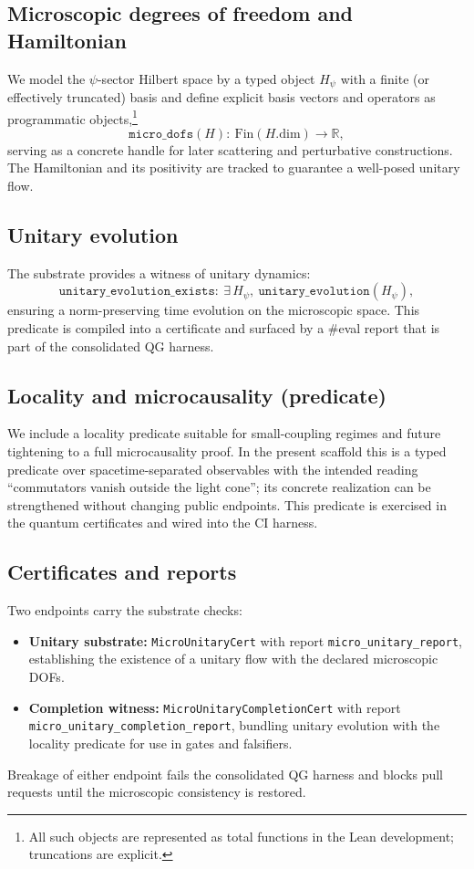 \documentclass[aps,prd,twocolumn,superscriptaddress,nofootinbib,floatfix,longbibliography]{revtex4-2}
\newcommand{\lean}[1]{\texttt{#1}}
\begin{document}
\subsection{Microscopic degrees of freedom and Hamiltonian}
We model the $\psi$-sector Hilbert space by a typed object $H_\psi$ with a finite (or effectively truncated) basis and define explicit basis vectors and operators as programmatic objects,\footnote{All such objects are represented as total functions in the Lean development; truncations are explicit.}
\begin{equation}
  \texttt{micro\_dofs}(H):\ \mathrm{Fin}(H.\mathrm{dim}) \to \mathbb{R},
\end{equation}
serving as a concrete handle for later scattering and perturbative constructions. The Hamiltonian and its positivity are tracked to guarantee a well-posed unitary flow.

\subsection{Unitary evolution}
The substrate provides a witness of unitary dynamics:
\begin{equation}
  \texttt{unitary\_evolution\_exists}:\ \exists\,H_\psi,\ \texttt{unitary\_evolution}(H_\psi),
\end{equation}
ensuring a norm-preserving time evolution on the microscopic space. This predicate is compiled into a certificate and surfaced by a \#eval report that is part of the consolidated QG harness.

\subsection{Locality and microcausality (predicate)}
We include a locality predicate suitable for small-coupling regimes and future tightening to a full microcausality proof. In the present scaffold this is a typed predicate over spacetime-separated observables with the intended reading ``commutators vanish outside the light cone''; its concrete realization can be strengthened without changing public endpoints. This predicate is exercised in the quantum certificates and wired into the CI harness.

\subsection{Certificates and reports}
Two endpoints carry the substrate checks:
\begin{itemize}
  \item \textbf{Unitary substrate:} \lean{MicroUnitaryCert} with report \lean{micro_unitary_report}, establishing the existence of a unitary flow with the declared microscopic DOFs.
  \item \textbf{Completion witness:} \lean{MicroUnitaryCompletionCert} with report \lean{micro_unitary_completion_report}, bundling unitary evolution with the locality predicate for use in gates and falsifiers.
\end{itemize}
Breakage of either endpoint fails the consolidated QG harness and blocks pull requests until the microscopic consistency is restored.
\end{document}
